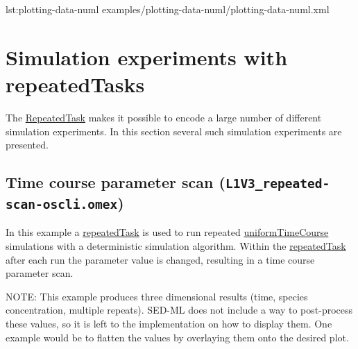 {lst:plotting-data-numl}
{examples/plotting-data-numl/plotting-data-numl.xml}

\pagebreak
\section{Simulation experiments with repeatedTasks}
The \hyperref[class:repeatedTask]{RepeatedTask} makes it possible to encode a large number of different simulation experiments. In this section several such simulation experiments are presented.

\subsection{Time course parameter scan (\texttt{L1V3\_repeated-scan-oscli.omex})}
In this example a \hyperref[class:repeatedTask]{repeatedTask} is used to run repeated \hyperref[class:uniformTimeCourse]{uniformTimeCourse} simulations with a deterministic simulation algorithm. Within the \hyperref[class:repeatedTask]{repeatedTask} after each run the parameter value is changed, resulting in a time course parameter scan.

NOTE: This example produces three dimensional results (time, species concentration, multiple repeats).  SED-ML \currentLV does not include a way to post-process these values, so it is left to the implementation on how to display them. One example would be to flatten the values by overlaying them onto the desired plot.

